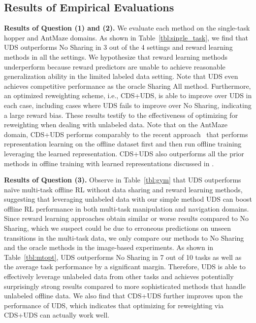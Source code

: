 \subsection{Results of Empirical Evaluations}
\label{sec:results}
\vspace{-0.1cm}
\noindent \textbf{Results of Question (1) and (2).} We evaluate each method on the single-task hopper and AntMaze domains. As shown in Table~\ref{tbl:single_task}, we find that UDS outperforms No Sharing in 3 out of the 4 settings and reward learning methods in all the settings. We hypothesize that reward learning methods underperform because reward predictors are unable to achieve reasonable generalization ability in the limited labeled data setting. Note that UDS even achieves competitive performance as the oracle Sharing All method. Furthermore, an optimized reweighting scheme, i.e., CDS+UDS, is able to improve over UDS in each case, including cases where UDS fails to improve over No Sharing, indicating a large reward bias. These results testify to the effectiveness of optimizing for reweighting when dealing with unlabeled data. Note that on the AntMaze domain, CDS+UDS performs comparably to the recent approach~\citep{yang2021trail} that performs representation learning on the offline dataset first and then run offline training leveraging the learned representation. CDS+UDS also outperforms all the prior methods in offline training with learned representations discussed in \cite{yang2021trail}.

\noindent \textbf{Results of Question (3).} Observe in Table~\ref{tbl:gym} that UDS outperforms na\"ive multi-task offline RL without data sharing and reward learning methods, suggesting that leveraging unlabeled data with our simple method UDS can boost offline RL performance in both multi-task manipulation and navigation domains.
Since reward learning approaches obtain similar or worse results compared to No Sharing, which we suspect could be due to erroneous predictions on unseen transitions in the multi-task data, we only compare our methods to No Sharing and the oracle methods in the image-based experiments. As shown in Table~\ref{tbl:mtopt}, UDS outperforms No Sharing in 7 out of 10 tasks as well as the average task performance by a significant margin. Therefore, UDS is able to effectively leverage unlabeled data from other tasks and achieves potentially surprisingly strong results compared to more sophisticated methods that handle unlabeled offline data. We also find that CDS+UDS further improves upon the performance of UDS, which indicates that optimizing for reweighting via CDS+UDS can actually work well.




